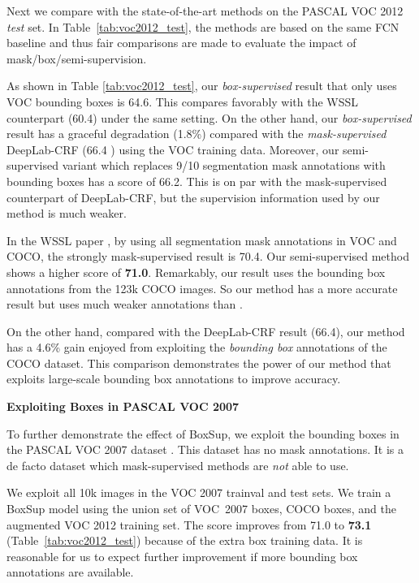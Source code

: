 \documentclass[10pt,twocolumn,letterpaper]{article}
\begin{document}
Next we compare with the state-of-the-art methods on the PASCAL VOC 2012 {\em test} set. In Table~\ref{tab:voc2012_test}, the methods are based on the same FCN baseline and thus fair comparisons are made to evaluate the impact of mask/box/semi-supervision.

As shown in Table \ref{tab:voc2012_test}, our \emph{box-supervised} result that only uses VOC bounding boxes is 64.6. This compares favorably with the WSSL \cite{papandreou2015weakly} counterpart (60.4) under the same setting. On the other hand, our \emph{box-supervised} result has a graceful degradation (1.8\%) compared with the \emph{mask-supervised} DeepLab-CRF (66.4 \cite{Chen2015}) using the VOC training data.
Moreover, our semi-supervised variant which replaces 9/10 segmentation mask annotations with bounding boxes has a score of 66.2. This is on par with the mask-supervised counterpart of DeepLab-CRF, but the supervision information used by our method is much weaker.

In the WSSL paper \cite{papandreou2015weakly}, by using all segmentation mask annotations in VOC and COCO, the strongly mask-supervised result is 70.4. Our semi-supervised method shows a higher score of \textbf{71.0}. Remarkably, our result uses the bounding box annotations from the 123k COCO images. So our method has a more accurate result but uses much weaker annotations than \cite{papandreou2015weakly}.

On the other hand, compared with the DeepLab-CRF result (66.4), our method has a 4.6\% gain enjoyed from exploiting the \emph{bounding box} annotations of the COCO dataset. This comparison demonstrates the power of our method that exploits large-scale bounding box annotations to improve accuracy.

\vspace{8pt}
\noindent\textbf{Exploiting Boxes in PASCAL VOC 2007}

To further demonstrate the effect of BoxSup, we exploit the bounding boxes in the PASCAL VOC 2007 dataset \cite{everingham2010pascal}. This dataset has no mask annotations. It is a de facto dataset which mask-supervised methods are \emph{not} able to use.

We exploit all 10k images in the VOC 2007 trainval and test sets. We train a BoxSup model using the union set of VOC~2007 boxes, COCO boxes, and the augmented VOC 2012 training set. The score improves from 71.0 to \textbf{73.1} (Table~\ref{tab:voc2012_test}) because of the extra box training data. It is reasonable for us to expect further improvement if more bounding box annotations are available.
\end{document}
